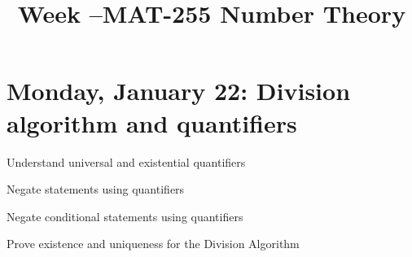 \documentclass{ximera}
\title{Week \week--MAT-255 Number Theory}
\begin{document}
\section{Monday, January 22: Division algorithm and quantifiers}

\begin{obj}
\item  Understand universal and existential quantifiers
\item  Negate statements using quantifiers
\item Negate conditional statements using quantifiers
\item Prove existence and uniqueness for the Division Algorithm
\end{obj}
\end{document}
